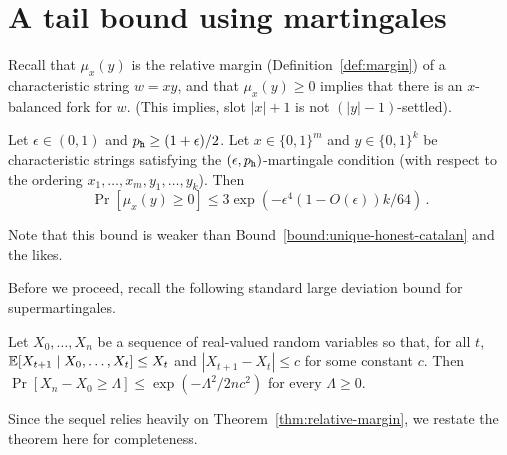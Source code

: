 \section{A tail bound using martingales}\label{sec:martingale-proof}

Recall that $\mu_x(y)$ is the relative margin (Definition~\ref{def:margin}) 
of a characteristic string $w = xy$, 
and that $\mu_x(y) \geq 0$ implies that there is an $x$-balanced fork for $w$. 
(This implies, slot $|x|+1$ is not $(|y|-1)$-settled).
\begin{bound}\label{bound:martingale}
  Let $\epsilon \in (0,1)$ and $p_{\mathtt{h}} \geq (1+\epsilon)/2$. 
  Let $x \in \{0,1\}^m$ and $y \in \{0,1\}^k$ be characteristic strings 
  satisfying the $(\epsilon, p_{\mathtt{h}})$-martingale condition (with respect to the ordering $x_1, \ldots, x_m, y_1, \ldots, y_k$). 
  Then
  \[
    \Pr[\mu_x(y) \geq 0] \leq
    3 \exp\left( -\epsilon^4 (1 - O(\epsilon) ) k/64 \right)  
    \, .
  \]
\end{bound}
Note that this bound is weaker than Bound~\ref{bound:unique-honest-catalan} and the likes.

Before we proceed, recall 
the following standard large deviation bound for supermartingales.
\begin{theorem}\label{thm:azuma}
  Let $X_0, \ldots, X_n$ be a sequence of real-valued random variables
  so that, for all $t$,
  $\operatorname{\mathbb{E}}[X_{t+1} \mid X_0, \ldots, X_{t}] \leq X_t$ and
  $|X_{t+1} - X_t| \leq c$ for some constant $c$. Then  
  $
    \Pr[X_n - X_0 \geq \Lambda] \leq
    \exp\left(-{\Lambda^2}/{2nc^2}\right)
  $ 
  for every $\Lambda \geq 0$.
\end{theorem}

  
Since the sequel relies heavily on Theorem~\ref{thm:relative-margin}, 
we restate the theorem here for completeness.

